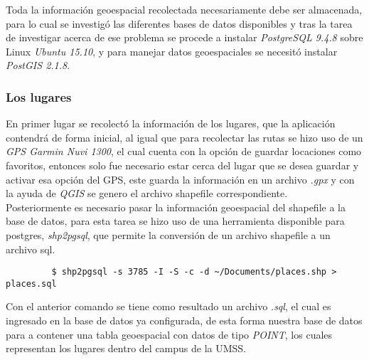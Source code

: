 
       Toda la información geoespacial recolectada necesariamente debe ser almacenada, para lo cual se investigó las diferentes bases de datos disponibles y tras la tarea de investigar acerca de ese problema se procede a instalar \emph{PostgreSQL 9.4.8} sobre Linux \emph{Ubuntu 15.10}, y para manejar datos geoespaciales se necesitó instalar \emph{PostGIS 2.1.8}.\\

       \subsubsection{Los lugares}
       \label{subs:Los lugares}

       En primer lugar se recolectó la información de los lugares, que la aplicación contendrá  de forma inicial, al igual que para recolectar las rutas se hizo uso de un \emph{GPS Garmin Nuvi 1300}, el cual cuenta con la opción de guardar locaciones como favoritos, entonces solo fue necesario estar cerca del lugar que se desea guardar y activar esa opción del GPS, este guarda la información en un archivo \emph{.gpx} y con la ayuda de \emph{QGIS} se genero el archivo shapefile correspondiente.\\

       Posteriormente es necesario pasar la información geoespacial del shapefile a la base de datos, para esta tarea se hizo uso de una herramienta disponible para postgres, \emph{shp2pgsql}, que permite la conversión de un archivo shapefile a un archivo sql.

       \begin{verbatim}
         $ shp2pgsql -s 3785 -I -S -c -d ~/Documents/places.shp > places.sql
       \end{verbatim}

       Con el anterior comando se tiene como resultado un archivo \emph{.sql}, el cual es ingresado en la base de datos ya configurada, de esta forma nuestra base de datos para a contener una tabla geoespacial con datos de tipo \emph{POINT}, los cuales representan los lugares dentro del campus de la UMSS.\\


